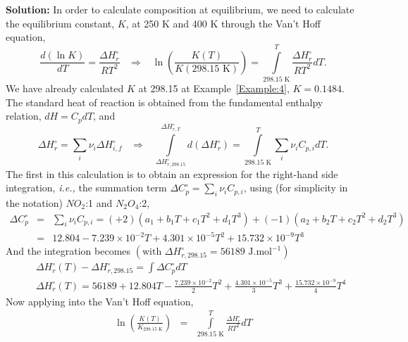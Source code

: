 \documentclass[12pts,a4paper,amsmath,amssymb,floatfix]{article}%
\newcommand{\frc}{\displaystyle\frac}
\newcommand{\ie}{{\it i.e., }}
\newcommand{\summation}[3][error]{\sum\limits_{#2}^{#3}#1}
\newcounter{reaction}
\begin{document}
\begin{enumerate}[1)]
{\bf Solution:} In order to calculate composition at equilibrium, we need to calculate the equilibrium constant, $K$, at 250 K and 400 K through the Van't Hoff equation,
\begin{displaymath}
    \frc{d\left(\ln{K}\right)}{dT} = \frc{\Delta H^{\circ}_{r}}{RT^{2}} \;\;\;\Longrightarrow \;\;\; \ln{\left(\frc{K(T)}{K(298.15\text{ K})}\right)} = \int\limits_{298.15\text{ K}}^{T}\frc{\Delta H^{\circ}_{r}}{RT^{2}}dT.
\end{displaymath}
We have already calculated $K$ at 298.15 at Example~\ref{Example:4}, $K= 0.1484$. The standard heat of reaction is obtained from the fundamental enthalpy relation, $dH= C_{p}dT$, and 
\begin{displaymath}
     \Delta H^{\circ}_{r} = \summation[\nu_{i}\Delta H^{\circ}_{i,f}]{i}{} \;\;\;\Longrightarrow\;\;\; \int\limits_{\Delta H^{\circ}_{r,298.15}}^{\Delta H^{\circ}_{r,T}}d\left(\Delta H^{\circ}_{r}\right) = \int\limits_{298.15\text{ K}}^{T}\summation[\nu_{i} C_{p,i}]{i}{}dT.
\end{displaymath}
The first in this calculation is to obtain an expression for the right-hand side integration, \ie the summation term $\Delta C_{p}^{\circ} = \summation[\nu_{i} C_{p,i}]{i}{}$, using (for simplicity in the notation) $NO_{2}$:1 and $N_{2}O_{4}$:2,
\begin{eqnarray}
   \Delta C_{p}^{\circ} &=& \summation[\nu_{i} C_{p,i}]{i}{} = (+2) \left(a_{1}+b_{1}T+c_{1}T^{2}+d_{1}T^{3}\right) + (-1)\left(a_{2}+b_{2}T+c_{2}T^{2}+d_{2}T^{3}\right) \nonumber \\
                     &=& 12.804 - 7.239\times 10^{-2}T + 4.301\times 10^{-5} T^{2} + 15.732\times 10^{-9}T^{3} \nonumber 
\end{eqnarray}
And the integration becomes $\left(\text{with }\Delta H^{\circ}_{r,298.15} = 56189\text{ J.mol}^{-1}\right)$
\begin{eqnarray}
    && \Delta H^{\circ}_{r}(T) - \Delta H^{\circ}_{r,298.15} = \int\Delta C_{p}^{\circ}dT \nonumber \\
    && \Delta H^{\circ}_{r}(T) = 56189 + 12.804 T - \frc{7.239\times 10^{-2}}{2}T^{2} + \frc{4.301\times 10^{-5}}{3}T^{3} + \frc{15.732\times 10^{-9}}{4}T^{4} \nonumber
\end{eqnarray}
Now applying into the Van't Hoff equation,
\begin{eqnarray}
  \ln{\left(\frc{K(T)}{K_{298.15\text{ K}}}\right)} &=& \int\limits_{298.15\text{ K}}^{T}\frc{\Delta H^{\circ}_{r}}{RT^{2}}dT \nonumber \\

\end{eqnarray}
\end{enumerate}
\end{document}

